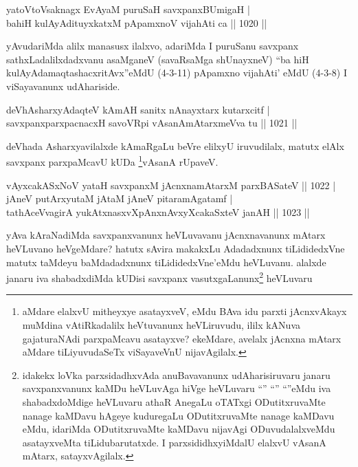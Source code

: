 \begin{shl}
yatoV\s toV\s saknagx EvAyaM puruSaH savxpanxBUmigaH | \\
bahiH kulAyAdituyxkatxM pApamxnoV vijahAti ca \hfill||  1020 ||  
\end{shl}

\begin{artha}
yAvudariMda alilx manasusx ilalxvo, adariMda I puruSanu savxpanx sathxLadalilxdadxvanu asaMganeV (savaRsaMga shUnayxneV) ``ba hiH kulAyAdamaqtashacxritAvx''eMdU (4-3-11) pApamxno vija{hA}ti' eMdU (4-3-8) I viSayavanunx udAhariside.
\end{artha}


\begin{shl}
deVhAsharxyAdaqteV kAmAH sanitx nAnayxtarx kutarxcitf | \\
savxpanxparxpacnacxH savoVR\s pi vAsanAmAtarxmeVva tu \hfill||  1021 ||  
\end{shl}

\begin{artha}
deVhada Asharxyavilalxde kAmaRgaLu beVre elilxyU iruvudilalx, matutx elAlx savxpanx parxpaMcavU kUDa \footnote{aMdare elalxvU mitheyxye asatayxveV, eMdu BAva idu parxti jAcnxvAkayx muMdina vAtiRkadalilx heVtuvanunx heVLiruvudu, ililx kANuva gajaturaNAdi parxpaMcavu asatayxve? ekeMdare, avelalx jAcnxna mAtarx aMdare tiLiyuvudaSeTx viSayaveVnU nijavAgilalx.}vAsanA rUpaveV.
\end{artha}


\begin{shl}
vAyxcakASxNoV yataH savxpanxM jAcnxnamAtarxM parxBASateV \hfill||  1022 | \\
jAneV putArxyutaM jAtaM jAneV pitaramAgatamf | \\
tathAceVvagirA yukAtxnasxvXpAnxnAvxyXcakaSxteV janAH \hfill||  1023 ||  
\end{shl}

\begin{artha}
yAva kAraNadiMda savxpanxvanunx heVLuvavanu jAcnxnavanunx mAtarx heVLuvano heVgeMdare? hatutx sAvira makakxLu Adadadxnunx tiLididedxVne matutx taMdeyu baMdadadxnunx tiLididedxVne'eMdu heVLuvanu. alalxde janaru iva shabadxdiMda kUDisi savxpanx vasutxgaLanunx\footnote{idakekx loVka parxsidadhxvAda anuBavavanunx udAharisiruvaru janaru savxpanxvanunx kaMDu heVLuvAga hiVge heVLuvaru ``\stext'' ``\stext'' ``\stext''eMdu iva shabadxdoMdige heVLuvaru athaR AnegaLu oTATxgi ODutitxruvaMte nanage kaMDavu hAgeye kuduregaLu ODutitxruvaMte nanage kaMDavu eMdu, idariMda ODutitxruvaMte kaMDavu nijavAgi ODuvudalalxveMdu asatayxveMta tiLidubarutatxde. I parxsididhxyiMdalU elalxvU vAsanA mAtarx, satayxvAgilalx.} heVLuvaru
\end{artha}


